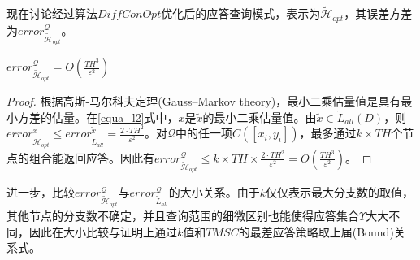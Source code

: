 现在讨论经过算法$DiffConOpt$优化后的应答查询模式，表示为$\tilde{\mathcal{H}}_{opt}$，其误差方差为$error_{\tilde{\mathcal{H}}_{opt}}^{\mathcal{Q}}$。

\begin{prop}
	\label{chap4_prop5}
	$error_{\tilde{\mathcal{H}}_{opt}}^{\mathcal{Q}} = O(\frac{TH^3}{\varepsilon^2})$
\end{prop}
\begin{proof}
	根据高斯-马尔科夫定理(Gauss–Markov theory)\cite{gauss_markov}，最小二乘估量值是具有最小方差的估量。在\ref{equa_l2}式中，$\ddot{x}$是$\tilde{x}$的最小二乘估量值。由$\tilde{x} \in \tilde{L}_{all}(D)$，则$error_{\tilde{\mathcal{H}}_{opt}}^{\ddot{x}} \leqslant error_{\tilde{L}_{all}}^{\tilde{x}} = \frac{2 \cdotp TH^2}{\varepsilon^2}$。对$\mathcal{Q}$中的任一项$C([x_{i},y_{i}])$，最多通过$k\times TH$个节点的组合能返回应答。因此有$error_{\tilde{\mathcal{H}}_{opt}}^{\mathcal{Q}} \leqslant k \times TH \times \frac{2 \cdotp TH^2}{\varepsilon^2} = O(\frac{TH^3}{\varepsilon^2})$。
\end{proof}

进一步，比较$error_{\tilde{\mathcal{H}}_{opt}}^{\mathcal{Q}}$与$error_{\tilde{L}_{all}}^{\mathcal{Q}}$的大小关系。由于$k$仅仅表示最大分支数的取值，其他节点的分支数不确定，并且查询范围的细微区别也能使得应答集合$\Upsilon$大大不同，因此在大小比较与证明上通过$k$值和$TMSC$的最差应答策略取上届(Bound)关系式。

